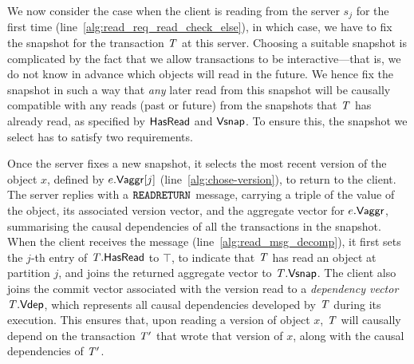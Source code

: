 

We now consider the case when the client is reading from the server $s_j$ for the first time (line~\ref{alg:read_req_read_check_else}), in which case, we have to fix the snapshot for the transaction $\mathit{T}$ at this server. Choosing a suitable snapshot is complicated by the fact that we allow transactions to be interactive---that is, we do not know in advance which objects will read in the future. We hence fix the snapshot in such a way that \emph{any} later read from this snapshot will be causally  compatible with any reads (past or future) from the snapshots that $\mathit{T}$ has already read, as specified by $\mathsf{HasRead}$ and $\mathsf{Vsnap}$. To ensure this, the snapshot we select has to satisfy two requirements.


Once the server fixes a new snapshot, it selects the most recent version of the object $x$, defined by $e.\mathsf{Vaggr}[j]$ (line~\ref{alg:chose-version}), to return to the client. The server replies with a ${\tt READRETURN}$ message, carrying a triple of the value of the object, its associated version vector, and the aggregate vector for $e.\mathsf{Vaggr}$, summarising the causal  dependencies of all the transactions in the snapshot. When the client receives the message (line~\ref{alg:read_msg_decomp}), it first sets the $j$-th entry of $\mathit{T}.\mathsf{HasRead}$ to $\top$, to indicate that $\mathit{T}$ has read an object at partition $j$, and joins the returned aggregate vector to $\mathit{T}.\mathsf{Vsnap}$. The client also joins the commit vector associated with the version read to a \emph{dependency vector} $\mathit{T}.\mathsf{Vdep}$, which represents all causal  dependencies developed by $\mathit{T}$ during its execution. This ensures that, upon reading a version of object $x$, $\mathit{T}$ will causally depend  on the transaction $\mathit{T}'$ that wrote that version of $x$, along with the causal dependencies of $\mathit{T}'$.

